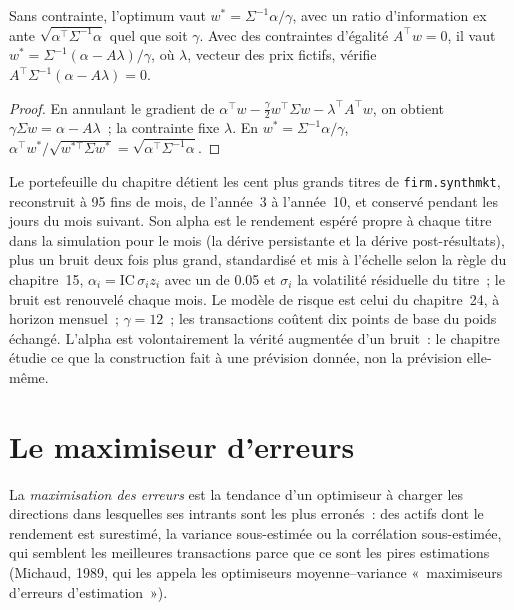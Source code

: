 \begin{proposition}\label{prop:rs:portfolio-construction-i:mv}
Sans contrainte, l'optimum vaut $w^* = \Sigma^{-1}\alpha/\gamma$, avec un ratio d'information ex ante $\sqrt{\alpha^\top\Sigma^{-1}\alpha}$ quel que soit $\gamma$. Avec
des contraintes d'égalité $A^\top w = 0$, il vaut $w^* = \Sigma^{-1}(\alpha - A\lambda)/\gamma$, où $\lambda$, vecteur des prix fictifs, vérifie $A^\top\Sigma^{-1}(\alpha - A\lambda) = 0$.
\end{proposition}

\begin{proof}
En annulant le gradient de $\alpha^\top w - \frac\gamma2 w^\top\Sigma w - \lambda^\top A^\top w$, on obtient $\gamma\Sigma w = \alpha - A\lambda$~; la contrainte fixe
$\lambda$. En $w^* = \Sigma^{-1}\alpha/\gamma$, $\alpha^\top w^*/\sqrt{w^{*\top}\Sigma w^*} = \sqrt{\alpha^\top\Sigma^{-1}\alpha}$.
\end{proof}

Le portefeuille du chapitre détient les cent plus grands titres de \texttt{firm.synthmkt}, reconstruit à 95 fins de mois, de l'année~3 à l'année~10, et conservé
pendant les jours du mois suivant. Son alpha est le rendement espéré propre à chaque titre dans la simulation pour le mois (la dérive persistante et la dérive post-résultats), plus un bruit deux fois plus grand,
standardisé et mis à l'échelle selon la règle du chapitre~15, $\alpha_i = \mathrm{IC}\,\sigma_i z_i$ avec un  de 0.05 et $\sigma_i$ la
volatilité résiduelle du titre~; le bruit est renouvelé chaque mois. Le modèle de risque est celui du chapitre~24, à horizon mensuel~; $\gamma = 12$~; les transactions coûtent dix points de base du poids échangé.
L'alpha est volontairement la vérité augmentée d'un bruit~: le chapitre étudie ce que la construction fait à une prévision donnée, non la prévision elle-même.

\section{Le maximiseur d'erreurs}

\begin{definition}\label{def:rs:portfolio-construction-i:error}
La \emph{maximisation des erreurs} est la tendance d'un optimiseur à charger les directions dans lesquelles ses intrants sont les plus erronés~: des actifs
dont le rendement est surestimé, la variance sous-estimée ou la corrélation sous-estimée, qui semblent les meilleures transactions parce que ce sont les pires estimations (Michaud,
1989, qui les appela les optimiseurs moyenne--variance «~maximiseurs d'erreurs d'estimation~»).
\end{definition}

